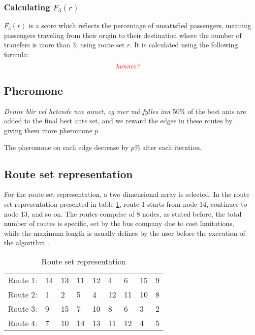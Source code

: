 

\subsubsection{Calculating $F_3(r)$}
$F_3(r)$ is a score which reflects the percentage of unsatisfied passengers, meaning passengers traveling from their origin to their destination where the number of transfers is more than 3, using route set $r$. It is calculated using the following formula:
$$\emph{\color{red}hannee?}$$

\subsection{Pheromone}
\emph{\color{red} Denne blir vel hetende noe annet, og mer må fylles inn}
50\% of the best ants are added to the final best ants set, and we reward the edges in these routes by giving them more pheromone $p$.
\par
The pheromone on each edge decrease by $p\%$ after each iteration. 


\subsection{Route set representation}
For the route set representation, a two dimensional array is selected. In the route set representation presented in table \ref{table:routeSetRepr}, route 1 starts from node 14, continues to node 13, and so on. The routes comprise of 8 nodes, as stated before, the total number of routes is specific, set by the bus company due to cost limitations, while the maximum length is usually defines by the user before the execution of the algorithm \citep{kechagiopoulos14}.
\begin{table}[H]
    \begin{center}
        \begin{tabular}{|l| l l l l l l l l|}
      \hline
        Route 1: & 14 & 13 & 11 & 12 & 4 & 6 & 15 & 9 \\
        Route 2: & 1 & 2 & 5 & 4 & 12 & 11 & 10 & 8 \\
        Route 3: & 9 & 15 & 7 & 10 & 8 & 6 & 3 & 2 \\
        Route 4: & 7 & 10 & 14 & 13 & 11 & 12 & 4 & 5 \\
      \hline
        \end{tabular}
    \end{center}
    \caption {Route set representation}
    \label{table:routeSetRepr}
\end{table}



